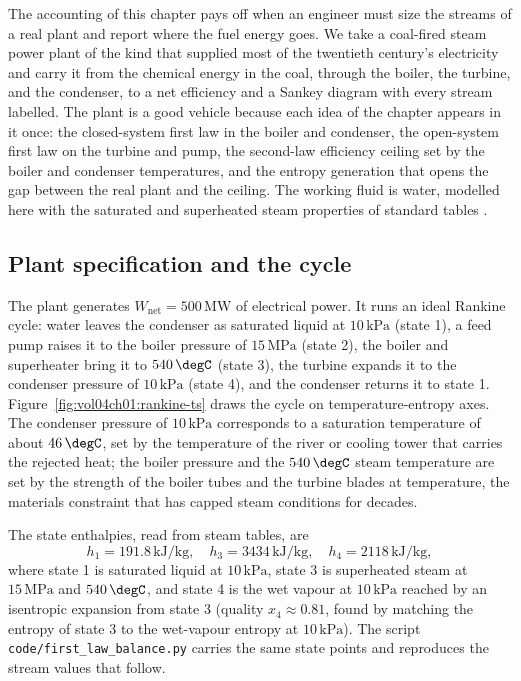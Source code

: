 The accounting of this chapter pays off when an engineer must size the
streams of a real plant and report where the fuel energy goes. We take a
coal-fired steam power plant of the kind that supplied most of the
twentieth century's electricity and carry it from the chemical energy in
the coal, through the boiler, the turbine, and the condenser, to a net
efficiency and a Sankey diagram with every stream labelled. The plant is
a good vehicle because each idea of the chapter appears in it once: the
closed-system first law in the boiler and condenser, the open-system
first law on the turbine and pump, the second-law efficiency ceiling set
by the boiler and condenser temperatures, and the entropy generation
that opens the gap between the real plant and the ceiling. The working
fluid is water, modelled here with the saturated and superheated steam
properties of standard tables \cite[Tables A-4 to A-6]{text:cengel-boles}.

\subsection{Plant specification and the cycle}

The plant generates $W_{\text{net}} = 500\,\text{MW}$ of electrical
power. It runs an ideal Rankine cycle: water leaves the condenser as
saturated liquid at $10\,\text{kPa}$ (state 1), a feed pump raises it to
the boiler pressure of $15\,\text{MPa}$ (state 2), the boiler and
superheater bring it to $540\,\degC$ (state 3), the turbine expands it
to the condenser pressure of $10\,\text{kPa}$ (state 4), and the
condenser returns it to state 1. Figure~\ref{fig:vol04ch01:rankine-ts}
draws the cycle on temperature-entropy axes. The condenser pressure of
$10\,\text{kPa}$ corresponds to a saturation temperature of about
$46\,\degC$, set by the temperature of the river or cooling tower that
carries the rejected heat; the boiler pressure and the
$540\,\degC$ steam temperature are set by the strength of the boiler
tubes and the turbine blades at temperature, the materials constraint
that has capped steam conditions for decades.

The state enthalpies, read from steam tables, are
\[
h_1 = 191.8\,\text{kJ}/\text{kg}, \quad
h_3 = 3434\,\text{kJ}/\text{kg}, \quad
h_4 = 2118\,\text{kJ}/\text{kg},
\]
where state 1 is saturated liquid at $10\,\text{kPa}$, state 3 is
superheated steam at $15\,\text{MPa}$ and $540\,\degC$, and state 4 is
the wet vapour at $10\,\text{kPa}$ reached by an isentropic expansion
from state 3 (quality $x_4 \approx 0.81$, found by matching the entropy
of state 3 to the wet-vapour entropy at $10\,\text{kPa}$). The script
\texttt{code/first\_law\_balance.py} carries the same state points and
reproduces the stream values that follow.

